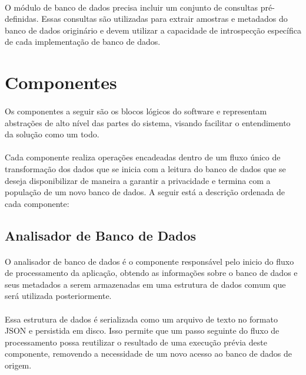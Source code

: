 \paragraph{} O módulo de banco de dados precisa incluir um conjunto de consultas pré-definidas. Essas consultas são utilizadas para extrair amostras e metadados do banco de dados originário e devem utilizar a capacidade de introspecção específica de cada implementação de banco de dados.

\section{Componentes}

\paragraph{} Os componentes a seguir são os blocos lógicos do software e representam abstrações de alto nível das partes do sistema, visando facilitar o entendimento da solução como um todo.

\paragraph{} Cada componente realiza operações encadeadas dentro de um fluxo único de transformação dos dados que se inicia com a leitura do banco de dados que se deseja disponibilizar de maneira a garantir a privacidade e termina com a população de um novo banco de dados. A seguir está a descrição ordenada de cada componente:

\subsection{Analisador de Banco de Dados}

\paragraph{} O analisador de banco de dados é o componente responsável pelo inicio do fluxo de processamento da aplicação, obtendo as informações sobre o banco de dados e seus metadados a serem armazenadas em uma estrutura de dados comum que será utilizada posteriormente.

\paragraph{} Essa estrutura de dados é serializada como um arquivo de texto no formato JSON e persistida em disco. Isso permite que um passo seguinte do fluxo de processamento possa reutilizar o resultado de uma execução prévia deste componente, removendo a necessidade de um novo acesso ao banco de dados de origem.

